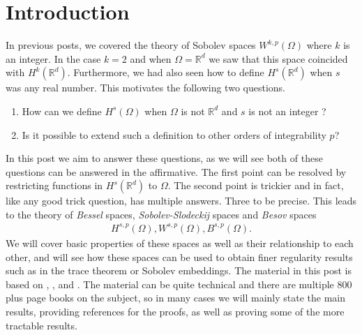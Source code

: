 \documentclass[
    a4paper,
    DIV=14,
    abstract=true,
    numbers=noenddot
]
{scrartcl}
\theoremstyle{definition}
\newcommand{\R}{\mathbb{R}}
\begin{document}
\section{Introduction}
In previous posts, we covered the theory of Sobolev spaces $W^{k,p}(\Omega )$ where $k$ is an integer. In the case $k=2$ and when $\Omega =\R^d$ we saw that this space coincided with $H^k(\R^d)$. Furthermore, we had also seen how to define $H^s(\R^d)$ when $s$ was any real number. This motivates the following two questions.
\begin{enumerate}
  \item How can we define $H^s(\Omega )$  when $\Omega $ is not $\R^d$ and $s$ is not an integer ?
  \item Is it possible to extend such a definition to other orders of integrability $p$?
\end{enumerate}
In this post we aim to answer these questions, as we will see both of these questions can be answered in the affirmative. The first point can be resolved by restricting functions in $H^s(\R^d)$ to $\Omega $. The second point is trickier and in fact, like any good trick question, has multiple answers. Three to be precise. This leads to the theory of \emph{Bessel} spaces, \emph{Sobolev-Slodeckij} spaces and \emph{Besov} spaces
\begin{align*}
  H^{s,p}(\Omega ),W^{s,p}(\Omega ),B^{s,p}(\Omega ).
\end{align*}
We will cover basic properties of these spaces as well as their relationship to each other, and will see how these spaces can be used to obtain finer regularity results such as in the trace theorem or Sobolev embeddings. The material in this post is based on \cite{agranovich2015sobolev}, \cite{di2012hitchhiker's}, \cite{triebel1992theory} and \cite{stein1970singular}. The material can be quite technical and there are multiple $800$ plus page books on the subject, so in many cases we will mainly state the main results, providing references for the proofs, as well as proving some of the more tractable results.
\end{document}
